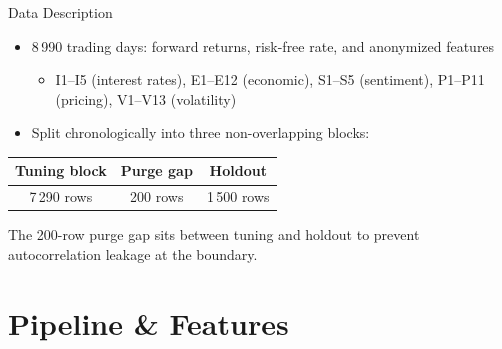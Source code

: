 \documentclass[aspectratio=169]{beamer}
\begin{document}
\begin{frame}{Data Description}
\begin{itemize}
    \item 8\,990 trading days: forward returns, risk-free rate, and anonymized features
    \begin{itemize}
        \item I1--I5 (interest rates), E1--E12 (economic), S1--S5 (sentiment), P1--P11 (pricing), V1--V13 (volatility)
    \end{itemize}
    \item Split chronologically into three non-overlapping blocks:
\end{itemize}
\vspace{0.15cm}
\centering
\small
\begin{tabular}{ccc}
    \toprule
    \textbf{Tuning block} & \textbf{Purge gap} & \textbf{Holdout} \\
    \midrule
    7\,290 rows & 200 rows & 1\,500 rows \\
    \bottomrule
\end{tabular}

\vspace{0.15cm}
\raggedright\footnotesize
The 200-row purge gap sits between tuning and holdout to prevent autocorrelation leakage at the boundary.
\end{frame}


\section{Pipeline \& Features}
\end{document}

